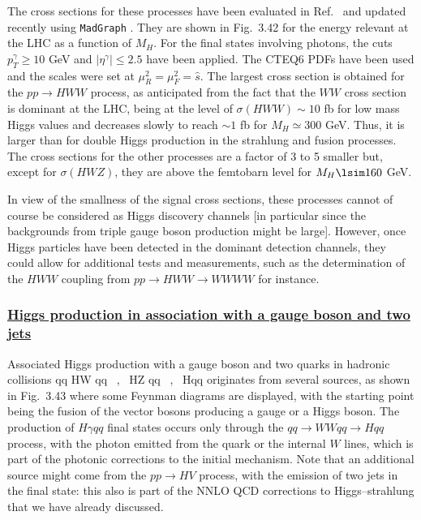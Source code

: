 The cross sections for these processes have been evaluated in 
Ref.~\cite{pp-HVV} and updated recently \cite{DWP} using {\tt MadGraph}
\cite{MadGraph}. They are shown 
in Fig.~3.42 for the energy relevant at the  LHC as a function of $M_H$. 
For the final states involving photons, the cuts $p_T^\gamma \geq 10$ GeV 
and $|\eta^\gamma| \leq 2.5$ have been applied. The CTEQ6 PDFs have been used 
and the scales were set at $\mu_R^2 = \mu_F^2 =\hat s$. 
The largest cross section is obtained for the $pp \to HWW$ process,
as anticipated from the fact that the $WW$ cross section is dominant
at the LHC, being at the level of $\sigma (HWW) \sim 10$ fb for low mass 
Higgs values and decreases slowly to reach $\sim 1$ fb for $M_H \simeq
300$ GeV. Thus, it is larger than for double Higgs production in the 
strahlung and fusion processes. The cross sections for the other processes
are a factor of 3 to 5 smaller but, except for $\sigma (HWZ)$, they are
above the femtobarn level for $M_H \lsim 160$ GeV. \s

In view of the smallness of the signal cross sections, these processes cannot
of course be considered as Higgs discovery channels [in particular since the 
backgrounds from triple gauge boson production might be large]. However, once 
Higgs particles have been detected in the dominant detection channels, they 
could allow for additional tests and measurements, such as the determination of
the $HWW$ coupling from $pp \to HWW \to WWWW$ for instance. 
 
\subsubsection*{\underline{Higgs production in association with a gauge boson
and two jets}}

Associated Higgs production with a gauge boson and two quarks in
hadronic collisions 
\beq
qq \to HW qq \ , \  HZ qq \ , \  H\gamma qq
\label{eq:HVqq}
\eeq
originates from several sources, as shown in Fig.~3.43 where some Feynman 
diagrams are displayed, with the starting point being the fusion of the vector 
bosons producing a gauge or a Higgs boson. The  production of $H\gamma qq$ final
states occurs only through the $qq \to WWqq \to Hqq$ process, with the
photon emitted from the quark or the internal $W$ lines, which is part
of the photonic corrections to the initial mechanism. Note that an additional 
source might come from the $pp \to HV$ process, with the emission of two jets 
in the final state: this also is part of the NNLO QCD corrections to 
Higgs--strahlung that we have already discussed.  

